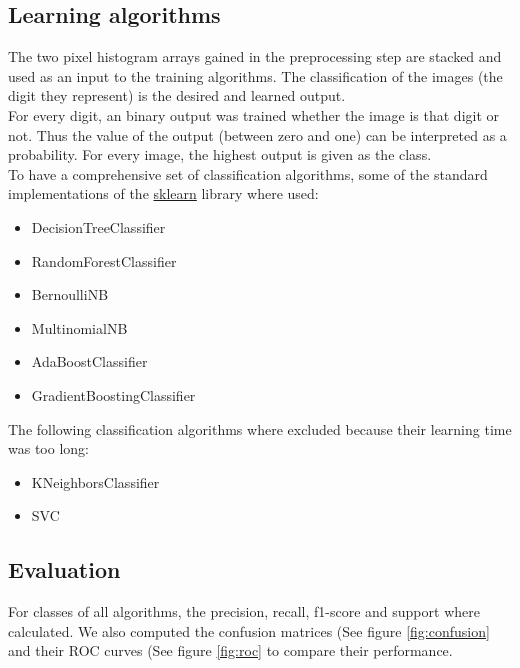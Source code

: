 \documentclass{scrartcl}
\begin{document}
\subsection{Learning algorithms}
\label{sec:Learning}
The two pixel histogram arrays gained in the preprocessing step are stacked and used as an input to the training algorithms. The classification of the images (the digit they represent) is the desired and learned output.\\
For every digit, an binary output was trained whether the image is that digit or not. Thus the value of the output (between zero and one) can be interpreted as a probability. For every image, the highest output is given as the class.\\
To have a comprehensive set of classification algorithms, some of the standard implementations of the \href{http://scikit-learn.org/stable/supervised_learning.html}{sklearn} library where used:

\begin{itemize}
\item DecisionTreeClassifier
\item RandomForestClassifier
\item BernoulliNB
\item MultinomialNB
\item AdaBoostClassifier
\item GradientBoostingClassifier
\end{itemize}

The following classification algorithms where excluded because their learning time was too long:

\begin{itemize}
\item KNeighborsClassifier
\item SVC
\end{itemize}

\subsection{Evaluation}
\label{sec:Evaluation}
For classes of all algorithms, the precision, recall, f1-score and support where calculated. We also computed the confusion matrices (See figure \ref{fig:confusion} and their ROC curves (See figure \ref{fig:roc} to compare their performance.\\
\end{document}
